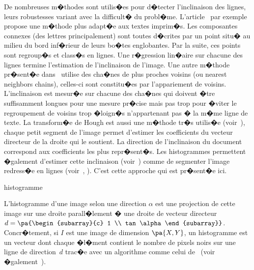 De nombreuses m�thodes sont utilis�es pour d�tecter l'inclinaison des lignes, leurs robustesses variant avec la difficult� du probl�me. L'article~ par exemple propose une m�thode plus adapt�e aux textes imprim�s. Les composantes connexes (des lettres principalement) sont toutes d�crites par un point situ� au milieu du bord inf�rieur de leurs bo�tes englobantes. Par la suite, ces points sont regroup�s et class�s en lignes. Une r�gression lin�aire sur chacune des lignes termine l'estimation de l'inclinaison de l'image.  Une autre m�thode pr�sent�e dans~ utilise des cha�nes de plus proches voisins (ou nearest neighbors chains), celles-ci sont constitu�es par l'appariement de voisins. L'inclinaison est mesur�e sur chacune des cha�nes qui doivent �tre suffisamment longues pour une mesure pr�cise mais pas trop pour �viter le regroupement de voisins trop �loign�s n'appartenant pas � la m�me ligne de texte.  La transform�e de Hough est aussi une m�thode tr�s utilis�e (voir~), chaque petit segment de l'image permet d'estimer les coefficients du vecteur directeur de la droite qui le soutient. La direction de l'inclinaison du document correspond aux coefficients les plus repr�sent�s. Les histogrammes permettent �galement d'estimer cette inclinaison (voir~) comme de segmenter l'image redress�e en lignes (voir~, ). C'est cette approche qui est pr�sent�e ici.




            \begin{xdefinition}{histogramme}
            
            L'histogramme d'une image selon une direction $\alpha$ est une projection de cette image 
            sur une droite parall�lement � une droite de vecteur directeur $d=\pa{\begin{subarray}{c} 1 
            \\ tan \alpha \end{subarray}}$. Concr�tement, si $I$ est une image de dimension $\pa{X,Y}$, un
            histogramme est un vecteur dont chaque �l�ment contient le nombre de pixels noirs sur une ligne de
            direction~$d$ trac�e avec un algorithme comme celui de~ (voir
            �galement~).
            
            \end{xdefinition}



